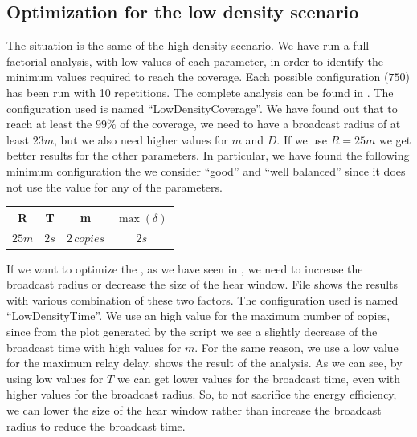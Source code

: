 \subsection{Optimization for the low density
scenario}\label{subsec:ldoptimization}

The situation is the same of the high density scenario. We have run a full
factorial analysis, with low values of each parameter, in order to identify the
minimum values required to reach the coverage. Each possible configuration
(\(750\)) has been run with 10 repetitions. The complete analysis can be found
in . The configuration used is named
``LowDensityCoverage''. We have found out that to reach at least the \(99\%\) of
the coverage, we need to have a broadcast radius of at least \(23m\), but we
also need higher values for \(m\) and \(D\). If we use \(R\!=\!25m\) we get
better results for the other parameters. In particular, we have found the
following minimum configuration the we consider ``good'' and ``well balanced''
since it does not use the value  for any of the parameters.

\begin{center}
	\begin{tabular}{cccc}
		\toprule
		R & T & m & \(\max(\delta)\) \\
		\midrule
		\(25m\) & \(2s\) & \(2\,\mathit{copies}\) & \(2s\) \\
		\bottomrule
	\end{tabular}
\end{center}

If we want to optimize the , as we have seen in
, we need to increase the broadcast radius or decrease the
size of the hear window. File  shows the results with
various combination of these two factors. The configuration used is named
``LowDensityTime''. We use an high value for the maximum number of copies,
since from the plot generated by the  script we see a slightly
decrease of the broadcast time with high values for \(m\). For the same reason,
we use a low value for the maximum relay delay.  shows the
result of the analysis. As we can see, by using low values for \(T\) we can get
lower values for the broadcast time, even with higher values for the broadcast
radius. So, to not sacrifice the energy efficiency, we can lower the size of the
hear window rather than increase the broadcast radius to reduce the broadcast
time.

